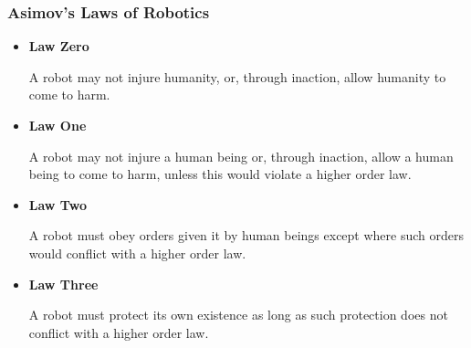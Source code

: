 \documentclass[UTF8,11pt,colorlinks,compress,openany]{beamer}%
\begin{document}
\begin{frame}\frametitle{Asimov's Laws of Robotics}
\begin{itemize}
	\item \textbf{Law Zero}

	A robot may not injure humanity, or, through inaction, allow humanity to come to harm.
	\item \textbf{Law One}

	A robot may not injure a human being or, through inaction, allow a human being to come to harm, unless this would violate a higher order law.
	\item \textbf{Law Two}

	A robot must obey orders given it by human beings except where such orders would conflict with a higher order law.
	\item \textbf{Law Three}

	A robot must protect its own existence as long as such protection does not conflict with a higher order law.
\end{itemize}
\end{frame}
\end{document}
